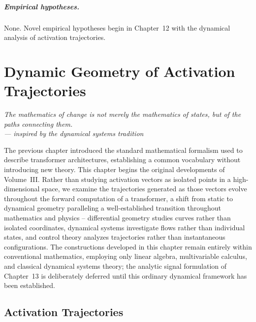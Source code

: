 \documentclass[11pt,twoside,openright]{book}
\numberwithin{equation}{chapter}
\theoremstyle{definition}
\theoremstyle{plain}
\theoremstyle{remark}
\theoremstyle{definition}
\begin{document}
\paragraph{Empirical hypotheses.} None. Novel empirical hypotheses begin
in Chapter~12 with the dynamical analysis of activation trajectories.

\chapter{Dynamic Geometry of Activation Trajectories}
\label{ch:trajectory-dynamics}

\vspace{1em}
\begin{flushright}\itshape
The mathematics of change is not merely the mathematics of states, but of
the paths connecting them.\\
\upshape --- inspired by the dynamical systems tradition
\end{flushright}
\vspace{1em}

The previous chapter introduced the standard mathematical formalism used
to describe transformer architectures, establishing a common vocabulary
without introducing new theory. This chapter begins the original
developments of Volume~III. Rather than studying activation vectors as
isolated points in a high-dimensional space, we examine the trajectories
generated as those vectors evolve throughout the forward computation of a
transformer, a shift from static to dynamical geometry paralleling a
well-established transition throughout mathematics and physics --
differential geometry studies curves rather than isolated coordinates,
dynamical systems investigate flows rather than individual states, and
control theory analyzes trajectories rather than instantaneous
configurations. The constructions developed in this chapter remain
entirely within conventional mathematics, employing only linear algebra,
multivariable calculus, and classical dynamical systems theory; the
analytic signal formulation of Chapter~13 is deliberately deferred until
this ordinary dynamical framework has been established.

\section{Activation Trajectories}
\end{document}
